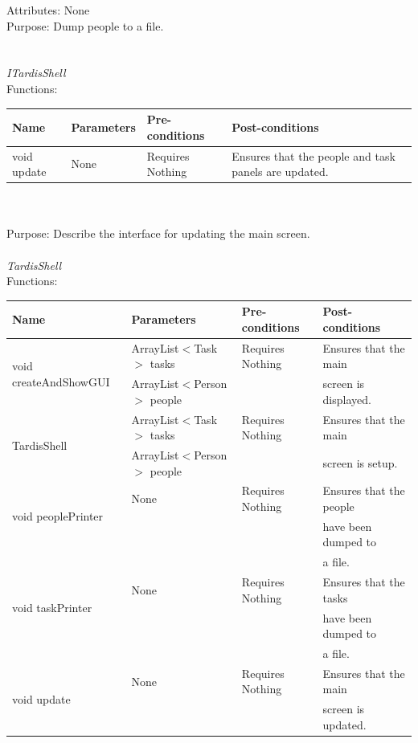Attributes: None\\
Purpose: Dump people to a file.\\
\\
\\
\emph{ITardisShell}\\
Functions:\\
\begin{tabular}{| l | l | l | l |}
\hline
Name & Parameters & Pre-conditions & Post-conditions\\
\hline
void update & None & Requires Nothing & Ensures that the people and task panels are updated.
\\
\hline
\end{tabular}\\
\\
Purpose: Describe the interface for updating the main screen.
\\
\\
\emph{TardisShell}\\
Functions:\\
\begin{tabular}{| l | l | l | l |}
\hline
Name & Parameters & Pre-conditions & Post-conditions\\
\hline
\multirow{2}{*}{void createAndShowGUI} & ArrayList$<$Task$>$ tasks        & Requires Nothing & Ensures that the main\\ 
			                                 & ArrayList$<$Person$>$ people &                             & screen is displayed. 
\\
\hline
\multirow{2}{*}{TardisShell} & ArrayList$<$Task$>$ tasks       & Requires Nothing & Ensures that the main\\ 
			          & ArrayList$<$Person$>$ people &                             & screen is setup. 
\\
\hline
\multirow{2}{*}{void peoplePrinter} & None & Requires Nothing & Ensures that the people\\ 
			                       &          &                             & have been dumped to\\
			                       &          &                             & a file.
\\
\hline
\multirow{2}{*}{void taskPrinter} & None & Requires Nothing & Ensures that the tasks\\ 
                       	                               &          &                             & have been dumped to\\
                                                       &          &                             & a file. 
\\
\hline
\multirow{2}{*}{void update} & None & Requires Nothing & Ensures that the main\\ 
			            &           &                             & screen is updated. 
\\
\hline
\end{tabular}\\
